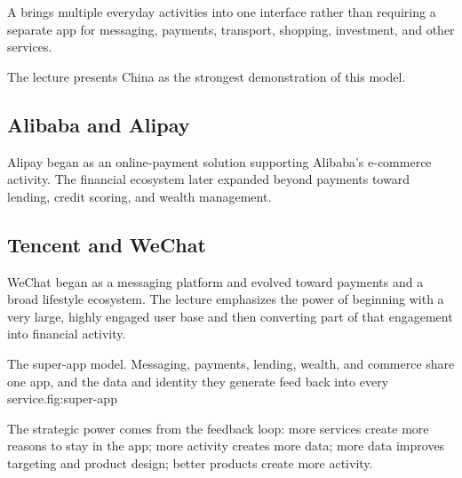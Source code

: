 A  brings multiple everyday activities into one interface rather than requiring a separate app for messaging, payments, transport, shopping, investment, and other services.

The lecture presents China as the strongest demonstration of this model.

\subsection{Alibaba and Alipay}

Alipay began as an online-payment solution supporting Alibaba's e-commerce activity. The financial ecosystem later expanded beyond payments toward lending, credit scoring, and wealth management.

\subsection{Tencent and WeChat}

WeChat began as a messaging platform and evolved toward payments and a broad lifestyle ecosystem. The lecture emphasizes the power of beginning with a very large, highly engaged user base and then converting part of that engagement into financial activity.

\begin{utpfig}{The super-app model. Messaging, payments, lending, wealth, and commerce share one app, and the data and identity they generate feed back into every service.}{fig:super-app}
\end{utpfig}

The strategic power comes from the feedback loop: more services create more reasons to stay in the app; more activity creates more data; more data improves targeting and product design; better products create more activity.

